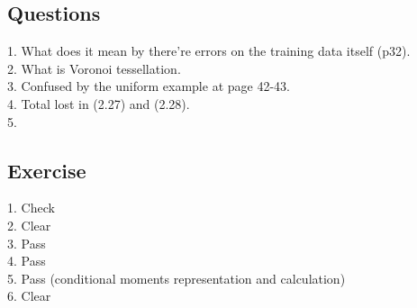 \subsection*{Questions}
1. What does it mean by there're errors on the training data itself (p32).\\
2. What is Voronoi tessellation. \\
3. Confused by the uniform example at page 42-43.\\
4. Total lost in (2.27) and (2.28).\\
5. 

\subsection*{Exercise}
1. Check \\
2. Clear \\
3. Pass \\
4. Pass \\
5. Pass (conditional moments representation and calculation) \\
6. Clear \\


